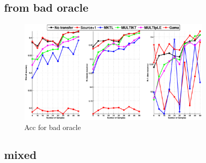 \subsection{from bad oracle}
\begin{figure}
\includegraphics[width=\textwidth,height=5cm]{fig/A2C_RBF_PHOG.eps}
\caption{Acc for bad oracle}
\end{figure}

\subsection{mixed}

